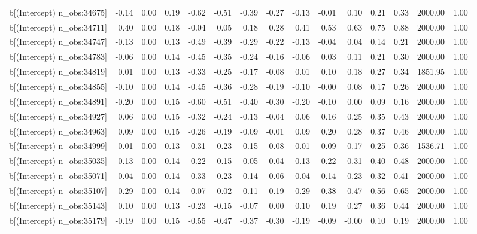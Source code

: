 \begin{table}[ht]
\begin{tabular}{rrrrrrrrrrrrrrr}
  b[(Intercept) n\_obs:34675] & -0.14 & 0.00 & 0.19 & -0.62 & -0.51 & -0.39 & -0.27 & -0.13 & -0.01 & 0.10 & 0.21 & 0.33 & 2000.00 & 1.00 \\ 
  b[(Intercept) n\_obs:34711] & 0.40 & 0.00 & 0.18 & -0.04 & 0.05 & 0.18 & 0.28 & 0.41 & 0.53 & 0.63 & 0.75 & 0.88 & 2000.00 & 1.00 \\ 
  b[(Intercept) n\_obs:34747] & -0.13 & 0.00 & 0.13 & -0.49 & -0.39 & -0.29 & -0.22 & -0.13 & -0.04 & 0.04 & 0.14 & 0.21 & 2000.00 & 1.00 \\ 
  b[(Intercept) n\_obs:34783] & -0.06 & 0.00 & 0.14 & -0.45 & -0.35 & -0.24 & -0.16 & -0.06 & 0.03 & 0.11 & 0.21 & 0.30 & 2000.00 & 1.00 \\ 
  b[(Intercept) n\_obs:34819] & 0.01 & 0.00 & 0.13 & -0.33 & -0.25 & -0.17 & -0.08 & 0.01 & 0.10 & 0.18 & 0.27 & 0.34 & 1851.95 & 1.00 \\ 
  b[(Intercept) n\_obs:34855] & -0.10 & 0.00 & 0.14 & -0.45 & -0.36 & -0.28 & -0.19 & -0.10 & -0.00 & 0.08 & 0.17 & 0.26 & 2000.00 & 1.00 \\ 
  b[(Intercept) n\_obs:34891] & -0.20 & 0.00 & 0.15 & -0.60 & -0.51 & -0.40 & -0.30 & -0.20 & -0.10 & 0.00 & 0.09 & 0.16 & 2000.00 & 1.00 \\ 
  b[(Intercept) n\_obs:34927] & 0.06 & 0.00 & 0.15 & -0.32 & -0.24 & -0.13 & -0.04 & 0.06 & 0.16 & 0.25 & 0.35 & 0.43 & 2000.00 & 1.00 \\ 
  b[(Intercept) n\_obs:34963] & 0.09 & 0.00 & 0.15 & -0.26 & -0.19 & -0.09 & -0.01 & 0.09 & 0.20 & 0.28 & 0.37 & 0.46 & 2000.00 & 1.00 \\ 
  b[(Intercept) n\_obs:34999] & 0.01 & 0.00 & 0.13 & -0.31 & -0.23 & -0.15 & -0.08 & 0.01 & 0.09 & 0.17 & 0.25 & 0.36 & 1536.71 & 1.00 \\ 
  b[(Intercept) n\_obs:35035] & 0.13 & 0.00 & 0.14 & -0.22 & -0.15 & -0.05 & 0.04 & 0.13 & 0.22 & 0.31 & 0.40 & 0.48 & 2000.00 & 1.00 \\ 
  b[(Intercept) n\_obs:35071] & 0.04 & 0.00 & 0.14 & -0.33 & -0.23 & -0.14 & -0.06 & 0.04 & 0.14 & 0.23 & 0.32 & 0.41 & 2000.00 & 1.00 \\ 
  b[(Intercept) n\_obs:35107] & 0.29 & 0.00 & 0.14 & -0.07 & 0.02 & 0.11 & 0.19 & 0.29 & 0.38 & 0.47 & 0.56 & 0.65 & 2000.00 & 1.00 \\ 
  b[(Intercept) n\_obs:35143] & 0.10 & 0.00 & 0.13 & -0.23 & -0.15 & -0.07 & 0.00 & 0.10 & 0.19 & 0.27 & 0.36 & 0.44 & 2000.00 & 1.00 \\ 
  b[(Intercept) n\_obs:35179] & -0.19 & 0.00 & 0.15 & -0.55 & -0.47 & -0.37 & -0.30 & -0.19 & -0.09 & -0.00 & 0.10 & 0.19 & 2000.00 & 1.00 \\ 

\end{tabular}
\end{table}
